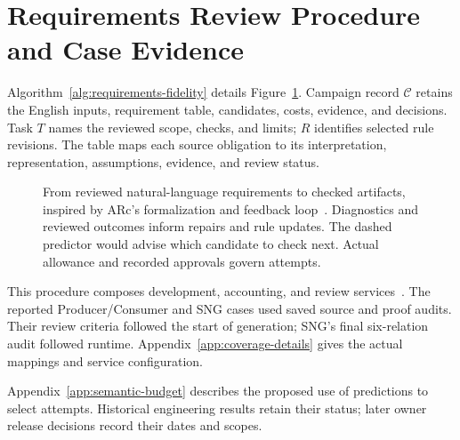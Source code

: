 \section{Requirements Review Procedure and Case Evidence}
\label{app:requirements-review}
Algorithm~\ref{alg:requirements-fidelity} details Figure~\ref{fig:requirements-review}. Campaign record $\mathcal{C}$ retains the English inputs, requirement table, candidates, costs, evidence, and decisions. Task $T$ names the reviewed scope, checks, and limits; $R$ identifies selected rule revisions. The table maps each source obligation to its interpretation, representation, assumptions, evidence, and review status.

\begin{figure}[!htbp]
\centering

\caption{From reviewed natural-language requirements to checked artifacts, inspired by ARc's formalization and feedback loop~\cite[Fig.~1, p.~4]{bayless2025arc}. Diagnostics and reviewed outcomes inform repairs and rule updates. The dashed predictor would advise which candidate to check next. Actual allowance and recorded approvals govern attempts.}
\label{fig:requirements-review}
\end{figure}



This procedure composes development, accounting, and review services~\cite{scpCheckpoint}. The reported Producer/Consumer and SNG cases used saved source and proof audits. Their review criteria followed the start of generation; SNG's final six-relation audit followed runtime. Appendix~\ref{app:coverage-details} gives the actual mappings and service configuration.

Appendix~\ref{app:semantic-budget} describes the proposed use of predictions to select attempts. Historical engineering results retain their status; later owner release decisions record their dates and scopes.

